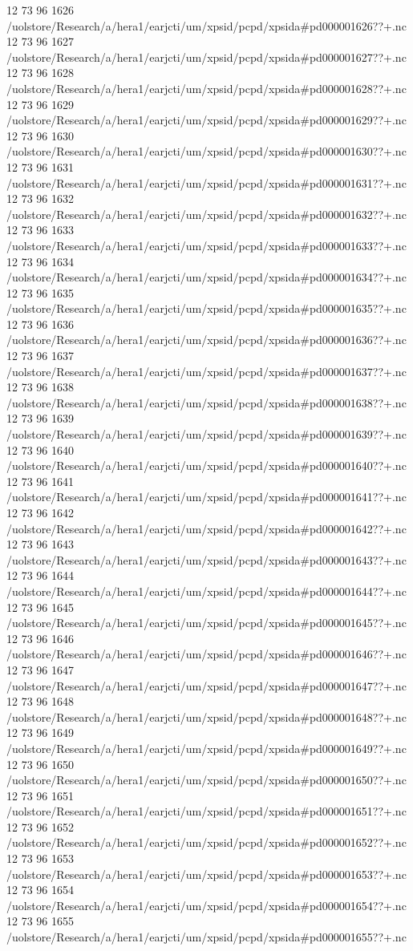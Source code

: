 12 73 96
1626
/uolstore/Research/a/hera1/earjcti/um/xpsid/pcpd/xpsida#pd000001626??+.nc
12 73 96
1627
/uolstore/Research/a/hera1/earjcti/um/xpsid/pcpd/xpsida#pd000001627??+.nc
12 73 96
1628
/uolstore/Research/a/hera1/earjcti/um/xpsid/pcpd/xpsida#pd000001628??+.nc
12 73 96
1629
/uolstore/Research/a/hera1/earjcti/um/xpsid/pcpd/xpsida#pd000001629??+.nc
12 73 96
1630
/uolstore/Research/a/hera1/earjcti/um/xpsid/pcpd/xpsida#pd000001630??+.nc
12 73 96
1631
/uolstore/Research/a/hera1/earjcti/um/xpsid/pcpd/xpsida#pd000001631??+.nc
12 73 96
1632
/uolstore/Research/a/hera1/earjcti/um/xpsid/pcpd/xpsida#pd000001632??+.nc
12 73 96
1633
/uolstore/Research/a/hera1/earjcti/um/xpsid/pcpd/xpsida#pd000001633??+.nc
12 73 96
1634
/uolstore/Research/a/hera1/earjcti/um/xpsid/pcpd/xpsida#pd000001634??+.nc
12 73 96
1635
/uolstore/Research/a/hera1/earjcti/um/xpsid/pcpd/xpsida#pd000001635??+.nc
12 73 96
1636
/uolstore/Research/a/hera1/earjcti/um/xpsid/pcpd/xpsida#pd000001636??+.nc
12 73 96
1637
/uolstore/Research/a/hera1/earjcti/um/xpsid/pcpd/xpsida#pd000001637??+.nc
12 73 96
1638
/uolstore/Research/a/hera1/earjcti/um/xpsid/pcpd/xpsida#pd000001638??+.nc
12 73 96
1639
/uolstore/Research/a/hera1/earjcti/um/xpsid/pcpd/xpsida#pd000001639??+.nc
12 73 96
1640
/uolstore/Research/a/hera1/earjcti/um/xpsid/pcpd/xpsida#pd000001640??+.nc
12 73 96
1641
/uolstore/Research/a/hera1/earjcti/um/xpsid/pcpd/xpsida#pd000001641??+.nc
12 73 96
1642
/uolstore/Research/a/hera1/earjcti/um/xpsid/pcpd/xpsida#pd000001642??+.nc
12 73 96
1643
/uolstore/Research/a/hera1/earjcti/um/xpsid/pcpd/xpsida#pd000001643??+.nc
12 73 96
1644
/uolstore/Research/a/hera1/earjcti/um/xpsid/pcpd/xpsida#pd000001644??+.nc
12 73 96
1645
/uolstore/Research/a/hera1/earjcti/um/xpsid/pcpd/xpsida#pd000001645??+.nc
12 73 96
1646
/uolstore/Research/a/hera1/earjcti/um/xpsid/pcpd/xpsida#pd000001646??+.nc
12 73 96
1647
/uolstore/Research/a/hera1/earjcti/um/xpsid/pcpd/xpsida#pd000001647??+.nc
12 73 96
1648
/uolstore/Research/a/hera1/earjcti/um/xpsid/pcpd/xpsida#pd000001648??+.nc
12 73 96
1649
/uolstore/Research/a/hera1/earjcti/um/xpsid/pcpd/xpsida#pd000001649??+.nc
12 73 96
1650
/uolstore/Research/a/hera1/earjcti/um/xpsid/pcpd/xpsida#pd000001650??+.nc
12 73 96
1651
/uolstore/Research/a/hera1/earjcti/um/xpsid/pcpd/xpsida#pd000001651??+.nc
12 73 96
1652
/uolstore/Research/a/hera1/earjcti/um/xpsid/pcpd/xpsida#pd000001652??+.nc
12 73 96
1653
/uolstore/Research/a/hera1/earjcti/um/xpsid/pcpd/xpsida#pd000001653??+.nc
12 73 96
1654
/uolstore/Research/a/hera1/earjcti/um/xpsid/pcpd/xpsida#pd000001654??+.nc
12 73 96
1655
/uolstore/Research/a/hera1/earjcti/um/xpsid/pcpd/xpsida#pd000001655??+.nc
